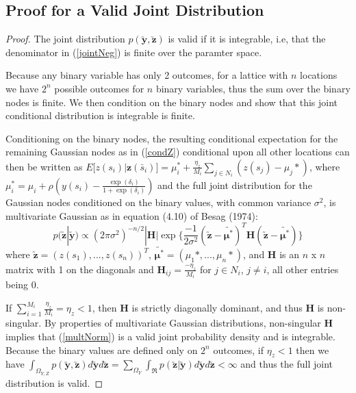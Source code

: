 \documentclass[12pt, a4paper, twoside]{article}
\begin{document}
\subsection{Proof for a Valid Joint Distribution} \label{JointProof}
\begin{proof}
	The joint distribution $p(\boldsymbol{\utilde{y}},\boldsymbol{\utilde{z}})$ is valid if it is integrable, i.e, that the denominator in (\ref{jointNeg}) is finite over the paramter space.
	
	Because any binary variable has only 2 outcomes, for a lattice with $n$ locations we have $2^n$ possible outcomes for $n$ binary variables, thus the sum over the binary nodes is finite. We then condition on the binary nodes and show that this joint conditional distribution is integrable is finite.
	
	Conditioning on the binary nodes, the resulting conditional expectation for the remaining Gaussian nodes as in (\ref{condZ}) conditional upon all other locations can then be written as $E\lbrack z(s_i) | \boldsymbol{z}(\bar{s}_i) \rbrack = \mu_i^* + \frac{\eta_{z}}{M_i}\sum_{j\in N_i} (z(s_j)-\mu_j*)$, where $\mu_i^* = \mu_i + \rho(y(s_i)-\frac{\exp(\delta_i)}{1+\exp(\delta_i)})$ and the full joint distribution for the Gaussian nodes conditioned on the binary values, with common variance $\sigma^2$, is multivariate Gaussian as in equation (4.10) of Besag (1974):
	\begin{equation} \label{multNorm}
	p(\boldsymbol{\utilde{z}}|\boldsymbol{\utilde{y}}) \propto (2\pi\sigma^2)^{-n/2}|\boldsymbol{H}|\exp\lbrace\frac{-1}{2\sigma^2}(\boldsymbol{\utilde{z}} - \boldsymbol{\utilde{\mu^*}})^T\boldsymbol{H}(\boldsymbol{\utilde{z}} - \boldsymbol{\utilde{\mu^*}})\rbrace
	\end{equation}
	where $\boldsymbol{\utilde{z}} = (z(s_1),...,z(s_n))^T$, $\boldsymbol{\utilde{\mu^*}} = (\mu_1*,...,\mu_n*)$, and $\boldsymbol{H}$ is an $n$ x $n$ matrix with 1 on the diagonals and $\boldsymbol{H}_{ij} = \frac{-\eta_z}{M_i}$ for $j \in N_i$, $j\neq i$, all other entries being 0. 
	
	If $\sum_{i=1}^{M_i}\frac{\eta_z}{M_i} = \eta_z < 1$, then $\boldsymbol{H}$ is strictly diagonally dominant, and thus $\boldsymbol{H}$ is non-singular. %
	By properties of multivariate Gaussian distributions, non-singular $\boldsymbol{H}$ implies that (\ref{multNorm}) is a valid joint probability density and is integrable. Because the binary values are defined only on $2^n$ outcomes, if %
	$\eta_z<1$ then we have
	\begin{math}
	\int_{\Omega_{Y,Z}}p(\boldsymbol{\utilde{y}},\boldsymbol{\utilde{z}})d\boldsymbol{\utilde{y}}d\boldsymbol{\utilde{z}} = \sum_{\Omega_Y}\int_{\Re}p(\boldsymbol{\utilde{z}}|\boldsymbol{\utilde{y}})d\boldsymbol{\utilde{y}}d\boldsymbol{\utilde{z}}<\infty
	\end{math}
	and thus the full joint distribution is valid. 
\end{proof}
\end{document}
